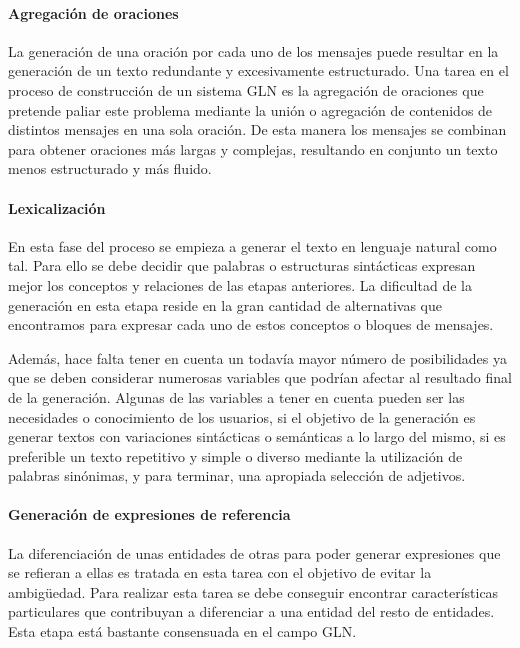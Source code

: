 \paragraph{Agregación de oraciones}\hfill

La generación de una oración por cada uno de los mensajes puede resultar en la generación de un texto redundante y excesivamente estructurado. Una tarea en el proceso de construcción de un sistema GLN es la agregación de oraciones que pretende paliar este problema mediante la unión o agregación de contenidos de distintos mensajes en una sola oración. De esta manera los mensajes se combinan para obtener oraciones más largas y complejas, resultando en conjunto un texto menos estructurado y más fluido.

\paragraph{Lexicalización}\hfill

En esta fase del proceso se empieza a generar el texto en lenguaje natural como tal. Para ello se debe decidir que palabras o estructuras sintácticas expresan mejor los conceptos y relaciones de las etapas anteriores. La dificultad de la generación en esta etapa reside en la gran cantidad de alternativas que encontramos para  expresar cada uno de estos conceptos o bloques de mensajes. 

Además, hace falta tener en cuenta un todavía mayor número de posibilidades ya que se deben considerar numerosas variables que podrían afectar al resultado final de la generación. Algunas de las variables a tener en cuenta pueden ser las necesidades o conocimiento de los usuarios, si el objetivo de la generación es generar textos con variaciones sintácticas o semánticas a lo largo del mismo, si es preferible un texto repetitivo y simple o diverso mediante la utilización de palabras sinónimas, y para terminar, una apropiada selección de adjetivos.


\paragraph{Generación de expresiones de referencia}\hfill

La diferenciación de unas entidades de otras para poder generar expresiones que se refieran a ellas es tratada en esta tarea con el objetivo de evitar la ambigüedad. Para realizar esta tarea se debe conseguir encontrar características particulares que contribuyan a diferenciar a una entidad del resto de entidades. Esta etapa está bastante consensuada en el campo GLN. 

